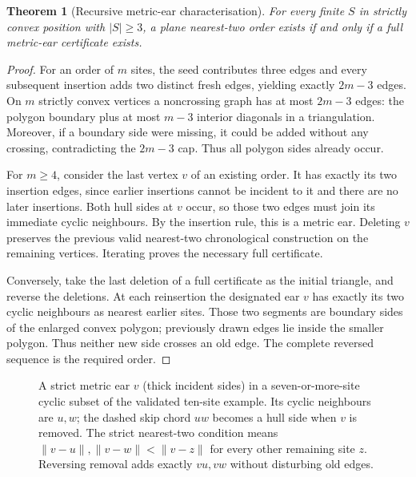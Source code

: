 \documentclass[11pt,a4paper]{article}
\newtheorem{theorem}{Theorem}[section]
\theoremstyle{definition}\newtheorem{definition}[theorem]{Definition}
\theoremstyle{remark}\newtheorem{remark}[theorem]{Remark}
\newcommand{\dist}[2]{\lVert #1-#2\rVert}
\begin{document}
\begin{theorem}[Recursive metric-ear characterisation]\label{thm:iff}
For every finite $S$ in strictly convex position with $|S|\ge3$, a plane nearest-two order exists if and only if a full metric-ear certificate exists.
\end{theorem}
\begin{proof}
For an order of $m$ sites, the seed contributes three edges and every subsequent insertion adds two distinct fresh edges, yielding exactly $2m-3$ edges. On $m$ strictly convex vertices a noncrossing graph has at most $2m-3$ edges: the polygon boundary plus at most $m-3$ interior diagonals in a triangulation. Moreover, if a boundary side were missing, it could be added without any crossing, contradicting the $2m-3$ cap. Thus all polygon sides already occur.

For $m\ge4$, consider the last vertex $v$ of an existing order. It has exactly its two insertion edges, since earlier insertions cannot be incident to it and there are no later insertions. Both hull sides at $v$ occur, so those two edges must join its immediate cyclic neighbours. By the insertion rule, this is a metric ear. Deleting $v$ preserves the previous valid nearest-two chronological construction on the remaining vertices. Iterating proves the necessary full certificate.

Conversely, take the last deletion of a full certificate as the initial triangle, and reverse the deletions. At each reinsertion the designated ear $v$ has exactly its two cyclic neighbours as nearest earlier sites. Those two segments are boundary sides of the enlarged convex polygon; previously drawn edges lie inside the smaller polygon. Thus neither new side crosses an old edge. The complete reversed sequence is the required order.
\end{proof}

\begin{figure}[ht]
\centering
\caption{A strict metric ear $v$ (thick incident sides) in a seven-or-more-site cyclic subset of the validated ten-site example. Its cyclic neighbours are $u,w$; the dashed skip chord $uw$ becomes a hull side when $v$ is removed. The strict nearest-two condition means $\dist{v}{u},\dist{v}{w}<\dist{v}{z}$ for every other remaining site $z$. Reversing removal adds exactly $vu,vw$ without disturbing old edges.}\label{fig:ear}
\end{figure}
\end{document}
